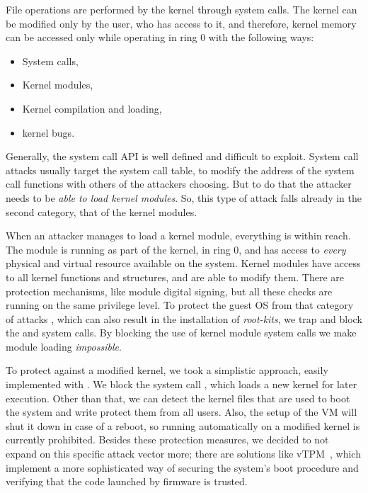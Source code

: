 \par File operations are performed by the kernel through system calls. The kernel can be modified only by the  user, who has access to it, and therefore, kernel memory can be accessed only while operating in ring 0 with the following ways:

\begin{itemize}
	\item System calls,
	\item Kernel modules,
	\item Kernel compilation and loading,
	\item kernel bugs.
\end{itemize}

\par Generally, the system call \ac{API} is well defined and difficult to exploit. System call attacks usually target the system call table, to modify the address of the system call functions with others of the attackers choosing. But to do that the attacker needs to be \emph{able to load kernel modules}. So, this type of attack falls already in the second category, that of the kernel modules.

\par When an attacker manages to load a kernel module, everything is within reach. The module is running as part of the kernel, in ring 0, and has access to \emph{every} physical and virtual resource available on the system. Kernel modules have access to all kernel functions and structures, and are able to modify them. There are protection mechanisms, like module digital signing, but all these checks are running on the same privilege level. To protect the guest \ac{OS} from that category
of attacks
, which can also result in the installation of \emph{root-kits}, we trap and block the  and  system calls.
By blocking the use of kernel module system calls we make module loading \emph{impossible}.

\par To protect against a modified kernel, we took a simplistic approach, easily implemented with . We block the system call , which loads a new kernel for later execution. Other than that, we can detect the kernel files that are used to boot the system and write protect them from all users. Also, the setup of the \ac{VM} will shut it down in case of a reboot, so running automatically on a modified kernel is currently prohibited. Besides these protection measures, we decided to not expand on this specific attack vector more; there are solutions like vTPM~\cite{perez2006vtpm}, which implement a more sophisticated way of securing the system's boot procedure and verifying that the code launched by firmware is trusted. 

